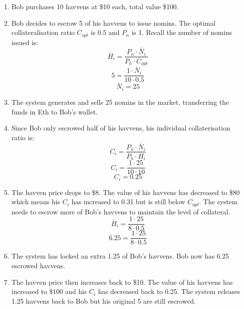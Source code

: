 \begin{enumerate}
\item{Bob purchases 10 havvens at \$10 each, total value \$100.}
\item{Bob decides to escrow 5 of his havvens to issue nomins. The optimal collateralisation ratio $C_{opt}$ is 0.5 and $P_n$ is 1. Recall the number of nomins issued is: }
$$ \check{H_i} = \frac{P_n \cdot \check{N_i}}{P_h \cdot C_{opt}}$$
$$ 5 = \frac{1 \cdot \check{N_i}}{10 \cdot 0.5} $$
$$ \check{N_i} = 25 $$
\item{The system generates and sells 25 nomins in the market, transferring the funds in Eth to Bob's wallet.}
\item{Since Bob only escrowed half of his havvens, his individual collaterisation ratio is:}
$$ C_i = \frac{P_n \cdot \check{N_i}}{P_h \cdot H_i}$$
$$ C_i = \frac{1 \cdot 25}{10 \cdot 10}$$
$$ C_i = 0.25 $$
\item{The havven price drops to \$8. The value of his havvens has decreased to \$80 which means his $C_i$ has increased to 0.31 but is still below $C_{opt}$. The system needs to escrow more of Bob's havvens to maintain the level of collateral.}
$$ \check{H_i} = \frac{1 \cdot 25}{8 \cdot 0.5} $$
$$ 6.25 = \frac{1 \cdot 25}{8 \cdot 0.5} $$
\item{The system has locked an extra 1.25 of Bob's havvens. Bob now has 6.25 escrowed havvens.}
\item{The havven price then increases back to \$10. The value of his havvens has increased to \$100 and his $C_i$ has decreased back to 0.25. The system releases 1.25 havvens back to Bob but his original 5 are still escrowed.}
\end{enumerate}




